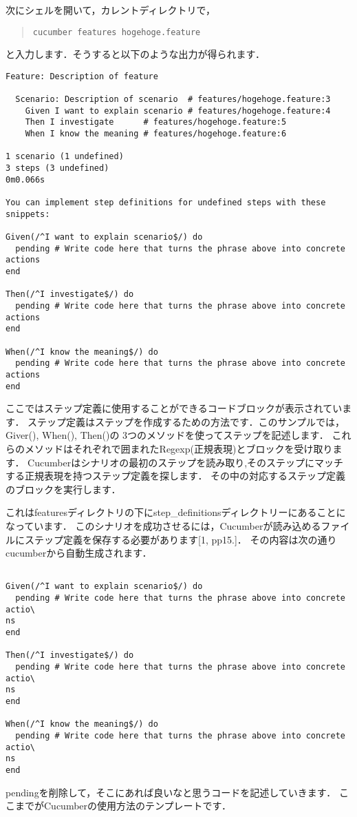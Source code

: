 次にシェルを開いて，カレントディレクトリで，
\begin{quote}\begin{verbatim}
cucumber features hogehoge.feature
\end{verbatim}\end{quote}
と入力します．そうすると以下のような出力が得られます．
\begin{lstlisting}[style=customRuby,basicstyle={\scriptsize\ttfamily}]
Feature: Description of feature

  Scenario: Description of scenario  # features/hogehoge.feature:3
    Given I want to explain scenario # features/hogehoge.feature:4
    Then I investigate      # features/hogehoge.feature:5
    When I know the meaning # features/hogehoge.feature:6

1 scenario (1 undefined)
3 steps (3 undefined)
0m0.066s

You can implement step definitions for undefined steps with these snippets:

Given(/^I want to explain scenario$/) do
  pending # Write code here that turns the phrase above into concrete actions
end

Then(/^I investigate$/) do
  pending # Write code here that turns the phrase above into concrete actions
end

When(/^I know the meaning$/) do
  pending # Write code here that turns the phrase above into concrete actions
end

\end{lstlisting}
ここではステップ定義に使用することができるコードブロックが表示されています．
ステップ定義はステップを作成するための方法です．このサンプルでは，Giver(), When(), Then()の
3つのメソッドを使ってステップを記述します．
これらのメソッドはそれぞれ\/\/で囲まれたRegexp(正規表現)とブロックを受け取ります．
Cucumberはシナリオの最初のステップを読み取り,そのステップにマッチする正規表現を持つステップ定義を探します．
その中の対応するステップ定義のブロックを実行します．

これはfeaturesディレクトリの下にstep\_definitionsディレクトリーにあることになっています．
このシナリオを成功させるには，Cucumberが読み込めるファイルにステップ定義を保存する必要があります[1, pp15.]．
その内容は次の通りcucumberから自動生成されます．
\begin{lstlisting}[style=customRuby,basicstyle={\scriptsize\ttfamily}]

Given(/^I want to explain scenario$/) do
  pending # Write code here that turns the phrase above into concrete actio\
ns  
end

Then(/^I investigate$/) do
  pending # Write code here that turns the phrase above into concrete actio\
ns  
end

When(/^I know the meaning$/) do
  pending # Write code here that turns the phrase above into concrete actio\
ns  
end

\end{lstlisting}
pendingを削除して，そこにあれば良いなと思うコードを記述していきます．
ここまでがCucumberの使用方法のテンプレートです．


